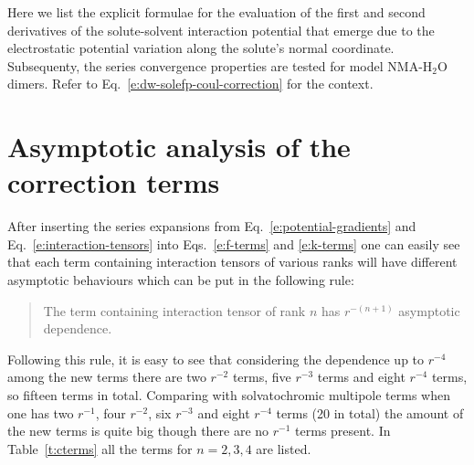 \documentclass[a4paper,titlepage,twoside,fleqn,12pt]{book}
\begin{document}
\begin{appendices}
Here we list the explicit formulae for the evaluation of the first and second derivatives
of the solute\hyp{}solvent interaction potential that emerge due to the electrostatic potential
variation along the solute's normal coordinate. Subsequenty, the series 
convergence properties are tested for model NMA-H$_2$O dimers. 
Refer to Eq.~\eqref{e:dw-solefp-coul-correction}
for the context.

\section{Asymptotic analysis of the correction terms}

After inserting the series expansions from Eq.~\eqref{e:potential-gradients} 
and Eq.~\eqref{e:interaction-tensors} into Eqs.~\eqref{e:f-terms} and \eqref{e:k-terms}
one can easily see that each term containing interaction tensors of various ranks
will have different asymptotic behaviours which can be put in 
the following rule:
%
\begin{quote}
The term containing interaction tensor of rank $n$ 
has $r^{-(n+1)}$ asymptotic dependence.
\end{quote}
%
Following this rule,
it is easy to see that considering the dependence up to $r^{-4}$ among the new terms
there are two $r^{-2}$ terms, five $r^{-3}$ terms and eight
$r^{-4}$ terms, so fifteen terms in total. Comparing with 
solvatochromic multipole terms when one has two $r^{-1}$,
four $r^{-2}$, six $r^{-3}$ and eight $r^{-4}$ terms (20 in total)
the amount of the new terms is quite big though there are no $r^{-1}$ 
terms present. In Table~\ref{t:cterms} all the terms for $n=2,3,4$
are listed.


\end{appendices}
\end{document}
